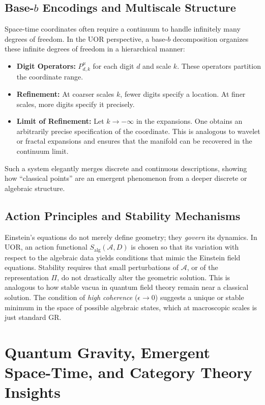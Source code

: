 \documentclass[11pt]{article}
\begin{document}
\subsection{Base-\texorpdfstring{$b$}{} Encodings and Multiscale Structure}
Space-time coordinates often require a continuum to handle infinitely many degrees of freedom. In the UOR perspective, a base-$b$ decomposition organizes these infinite degrees of freedom in a hierarchical manner:
\begin{itemize}
\item \textbf{Digit Operators:} $P_{d,k}^\mu$ for each digit $d$ and scale $k$. These operators partition the coordinate range.
\item \textbf{Refinement:} At coarser scales $k$, fewer digits specify a location. At finer scales, more digits specify it precisely.
\item \textbf{Limit of Refinement:} Let $k\to-\infty$ in the expansions. One obtains an arbitrarily precise specification of the coordinate. This is analogous to wavelet or fractal expansions and ensures that the manifold can be recovered in the continuum limit.
\end{itemize}
Such a system elegantly merges discrete and continuous descriptions, showing how “classical points” are an emergent phenomenon from a deeper discrete or algebraic structure.

\subsection{Action Principles and Stability Mechanisms}
Einstein’s equations do not merely define geometry; they \emph{govern} its dynamics. In UOR, an action functional $S_{\mathrm{alg}}(\mathcal{A},D)$ is chosen so that its variation with respect to the algebraic data yields conditions that mimic the Einstein field equations. Stability requires that small perturbations of $\mathcal{A}$, or of the representation $\Pi$, do not drastically alter the geometric solution. This is analogous to how stable vacua in quantum field theory remain near a classical solution. The condition of \emph{high coherence} ($\epsilon \to 0$) suggests a unique or stable minimum in the space of possible algebraic states, which at macroscopic scales is just standard GR.

\section{Quantum Gravity, Emergent Space-Time, and Category Theory Insights}
\label{sec:connections}
\end{document}

